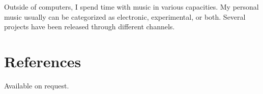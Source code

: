 \documentclass[margintitle,line]{res}
\begin{document}
\begin{resume}
Outside of computers, I spend time with music in various capacities. My personal music usually can be categorized as electronic, experimental, or both. Several projects have been released through different channels.


\section{References}

Available on request.

\end{resume}
\end{document}
